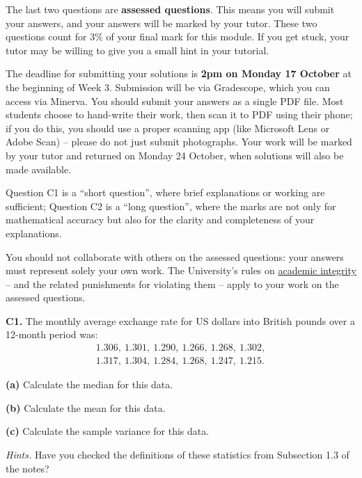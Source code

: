 \documentclass[
  a4paper,
]{book}
\theoremstyle{definition}
\theoremstyle{definition}
\theoremstyle{definition}
\theoremstyle{definition}
\theoremstyle{remark}
\begin{document}
The last two questions are \textbf{assessed questions}. This means you will submit your answers, and your answers will be marked by your tutor. These two questions count for 3\% of your final mark for this module. If you get stuck, your tutor may be willing to give you a small hint in your tutorial.

The deadline for submitting your solutions is \textbf{2pm on Monday 17 October} at the beginning of Week 3. Submission will be via Gradescope, which you can access via Minerva.
You should submit your answers as a single PDF file. Most students choose to hand-write their work, then scan it to PDF using their phone; if you do this, you should use a proper scanning app (like Microsoft Lens or Adobe Scan) -- please do not just submit photographs. Your work will be marked by your tutor and returned on Monday 24 October, when solutions will also be made available.

Question C1 is a ``short question'', where brief explanations or working are sufficient; Question C2 is a ``long question'', where the marks are not only for mathematical accuracy but also for the clarity and completeness of your explanations.

You should not collaborate with others on the assessed questions: your answers must represent solely your own work. The University's rules on \href{https://library.leeds.ac.uk/info/1401/academic_skills/46/academic_integrity_and_plagiarism}{academic integrity} -- and the related punishments for violating them -- apply to your work on the assessed questions.

\textbf{C1.} The monthly average exchange rate for US dollars into British pounds over a 12-month period was:
\begin{gather*}
1.306, \ 1.301, \ 1.290, \ 1.266, \ 1.268, \ 1.302,\\
1.317, \ 1.304, \ 1.284, \ 1.268, \ 1.247, \ 1.215.
\end{gather*}

\textbf{(a)} Calculate the median for this data.

\textbf{(b)} Calculate the mean for this data.

\textbf{(c)} Calculate the sample variance for this data.

\begin{myanswers}
\emph{Hints.}
Have you checked the definitions of these statistics from Subsection 1.3 of the notes?

\end{myanswers}
\end{document}
